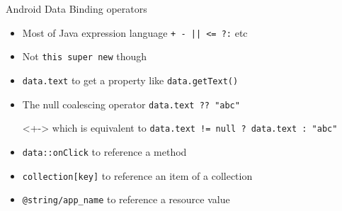 \begin{frame}[fragile]{Android Data Binding operators}
\begin{itemize}
  \item<+-> Most of Java expression language \lstinline`+ - || <= ?:` etc
  \item<+-> Not \lstinline`this super new` though
  \item<+-> \lstinline`data.text` to get a property like \lstinline`data.getText()`
  \item<+-> The null coalescing operator \lstinline`data.text ?? "abc"`
  \item[]<+-> which is equivalent to \lstinline`data.text != null ? data.text : "abc"`
  \item<+-> \lstinline`data::onClick` to reference a method
  \item<+-> \lstinline`collection[key]` to reference an item of a collection
  \item<+-> \lstinline`@string/app_name` to reference a resource value
\end{itemize}
\end{frame}
